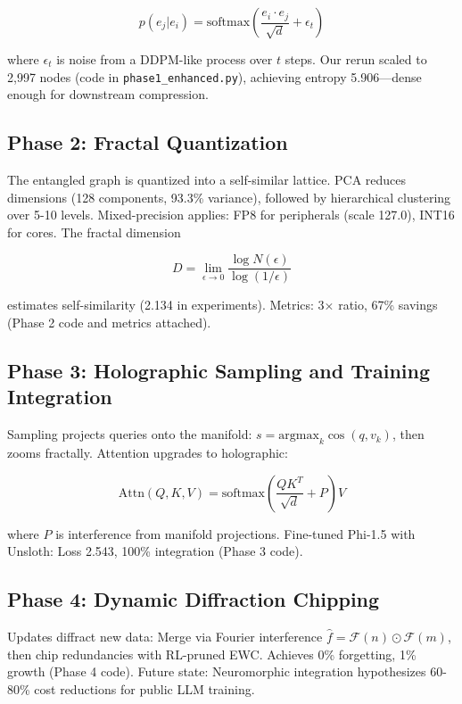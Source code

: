 \documentclass[12pt,a4paper]{article}
\newcommand{\softmax}{\text{softmax}}
\newcommand{\argmax}{\text{argmax}}
\newcommand{\attn}{\text{Attn}}
\DeclareMathOperator{\cosine}{cos}
\begin{document}
\begin{equation}
p(e_j | e_i) = \softmax\left(\frac{e_i \cdot e_j}{\sqrt{d}} + \epsilon_t\right)
\end{equation}

where $\epsilon_t$ is noise from a DDPM-like process over $t$ steps. Our rerun scaled to 2,997 nodes (code in \texttt{phase1\_enhanced.py}), achieving entropy 5.906---dense enough for downstream compression.

\subsection{Phase 2: Fractal Quantization}

The entangled graph is quantized into a self-similar lattice. PCA reduces dimensions (128 components, 93.3\% variance), followed by hierarchical clustering over 5-10 levels. Mixed-precision applies: FP8 for peripherals (scale 127.0), INT16 for cores. The fractal dimension

\begin{equation}
D = \lim_{\epsilon \to 0} \frac{\log N(\epsilon)}{\log (1/\epsilon)}
\end{equation}

estimates self-similarity (2.134 in experiments). Metrics: 3× ratio, 67\% savings (Phase 2 code and metrics attached).

\subsection{Phase 3: Holographic Sampling and Training Integration}

Sampling projects queries onto the manifold: $s = \argmax_k \cosine(q, v_k)$, then zooms fractally. Attention upgrades to holographic:

\begin{equation}
\attn(Q, K, V) = \softmax\left(\frac{QK^T}{\sqrt{d}} + P\right) V
\end{equation}

where $P$ is interference from manifold projections. Fine-tuned Phi-1.5 with Unsloth: Loss 2.543, 100\% integration (Phase 3 code).

\subsection{Phase 4: Dynamic Diffraction Chipping}

Updates diffract new data: Merge via Fourier interference $\hat{f} = \mathcal{F}(n) \odot \mathcal{F}(m)$, then chip redundancies with RL-pruned EWC. Achieves 0\% forgetting, 1\% growth (Phase 4 code). Future state: Neuromorphic integration hypothesizes 60-80\% cost reductions for public LLM training.
\end{document}
